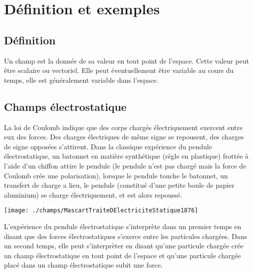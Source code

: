 
\section{Définition et exemples}
%
\subsection{Définition}

Un champ est la donnée de sa valeur en tout point de l'espace. Cette valeur peut être scalaire ou vectoriel. Elle peut éventuellement être variable au cours du temps, elle est généralement variable dans l'espace.

\subsection{Champs électrostatique}

La loi de Coulomb indique que des corps chargés électriquement exercent entre eux des forces. Des charges électriques de même signe se repousent, des charges de signe opposées s'attirent. Dans la classique expérience du pendule électrostatique, un batonnet en matière synthétique (règle en plastique) frottée à l'aide d'un chiffon attire le pendule (le pendule n'est pas chargé mais la force de Coulomb crée une polarisation), lorsque le pendule touche le batonnet, un transfert de charge a lieu, le pendule (constitué d'une petite boule de papier aluminium) se charge électriquement, et est alors repoussé.

\begin{center}
\texttt{[image: ./champs/MascartTraiteDElectriciteStatique1876]}
\end{center}

L'expérience du pendule électrostatique s'interprète dans un premier temps en disant que des forces électrostatiques s'exerce entre les particules chargées. Dans un second temps, elle peut s'interprèter en disant qu'une particule chargée crée un champ électrostatique en tout point de l'espace et qu'une particule chargée placé dans un champ électrostatique subit une force.

